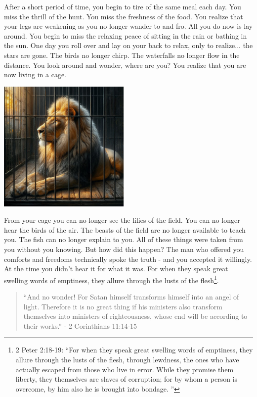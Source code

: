 \documentclass[10pt]{article}
\begin{document}
\begin{multicols}{2}
After a short period of time, you begin to tire of the same meal each day. You miss the thrill of the hunt. You miss the freshness of the food. You realize that your legs are weakening as you no longer wander to and fro. All you do now is lay around. You begin to miss the relaxing peace of sitting in the rain or bathing in the sun. One day you roll over and lay on your back to relax, only to realize... the stars are gone. The birds no longer chirp. The waterfalls no longer flow in the distance. You look around and wonder, where are you? You realize that you are now living in a cage. 

\begin{center}
	\includegraphics[width=0.48\textwidth]{cage.jpeg}
\end{center}

From your cage you can no longer see the lilies of the field. You can no longer hear the birds of the air. The beasts of the field are no longer available to teach you. The fish can no longer explain to you. All of these things were taken from you without you knowing. But how did this happen? The man who offered you comforts and freedoms technically spoke the truth - and you accepted it willingly. At the time you didn't hear it for what it was. For when they speak great swelling words of emptiness, they allure through the lusts of the flesh\footnote{2 Peter 2:18-19: ``For when they speak great swelling words of emptiness, they allure through the lusts of the flesh, through lewdness, the ones who have actually escaped from those who live in error. While they promise them liberty, they themselves are slaves of corruption; for by whom a person is overcome, by him also he is brought into bondage. ''}.

\begin{quotation}
``And no wonder! For Satan himself transforms himself into an angel of light. Therefore it is no great thing if his ministers also transform themselves into ministers of righteousness, whose end will be according to their works.'' - 2 Corinthians 11:14-15
\end{quotation}


\end{multicols}
\end{document}
